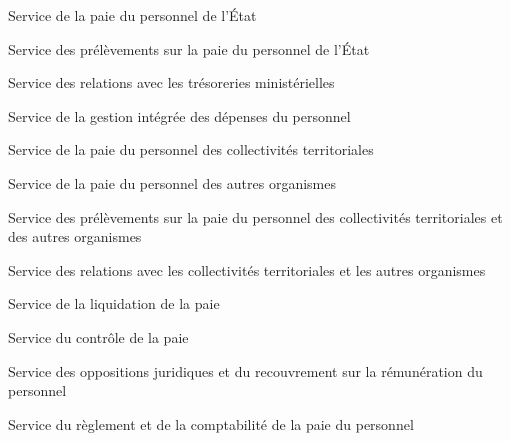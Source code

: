 \documentclass[a4paper,12pt,oneside]{report}
\begin{document}
{
\begin{svc}
\item Service de la paie du personnel de l'État
\item Service des prélèvements sur la paie du personnel de l'État
\item Service des relations avec les trésoreries ministérielles
\item Service de la gestion intégrée des dépenses du personnel
\end{svc}
\begin{svc}
\item Service de la paie du personnel des collectivités territoriales
\item Service de la paie du personnel des autres organismes
\item Service des prélèvements sur la paie du personnel des collectivités territoriales et des autres organismes
\item Service des relations avec les collectivités territoriales et les autres organismes
\end{svc}
\begin{svc}
\item Service de la liquidation de la paie
\item Service du contrôle de la paie
\item Service des oppositions juridiques et du recouvrement sur la rémunération du personnel
\item Service du règlement et de la comptabilité de la paie du personnel
\end{svc}

}
\end{document}
